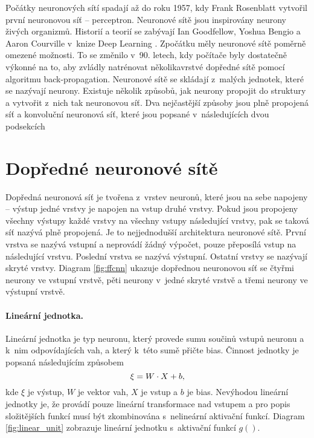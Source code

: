 Počátky neuronových sítí spadají až do roku 1957, kdy Frank Rosenblatt \cite{Rosenblatt1958} vytvořil první neuronovou síť -- perceptron.
Neuronové sítě jsou inspirovány neurony živých organizmů.
Historií a teorií se zabývají Ian Goodfellow, Yoshua Bengio a Aaron Courville v~knize Deep Learning \cite{Goodfellow-et-al-2016}.
Zpočátku měly neuronové sítě poměrně omezené možnosti.
To se změnilo v~90. letech, kdy počítače byly dostatečně výkonné na to, aby zvládly natrénovat několikavrstvé dopředné sítě pomocí algoritmu back-propagation.
Neuronové sítě se skládají z~malých jednotek, které se nazývají neurony.
Existuje několik způsobů, jak neurony propojit do struktury a vytvořit z~nich tak neuronovou síť.
Dva nejčastější způsoby jsou plně propojená síť a konvoluční neuronová síť, které jsou popsané v~následujících dvou podsekcích

\section{Dopředné neuronové sítě}
\label{sub:ffnn}

Dopředná neuronová síť je tvořena z~vrstev neuronů, které jsou na sebe napojeny -- výstup jedné vrstvy je napojen na vstup druhé vrstvy.
Pokud jsou propojeny všechny výstupy každé vrstvy na všechny vstupy následující vrstvy, pak se taková síť nazývá plně propojená.
Je to nejjednodušší architektura neuronové sítě.
První vrstva se nazývá vstupní a neprovádí žádný výpočet, pouze přeposílá vstup na následující vrstvu.
Poslední vrstva se nazývá výstupní.
Ostatní vrstvy se nazývají skryté vrstvy.
Diagram \ref{fig:ffcnn} ukazuje dopřednou neuronovou síť se čtyřmi neurony ve vstupní vrstvě, pěti neurony v~jedné skryté vrstvě a třemi neurony ve výstupní vrstvě.

\paragraph{Lineární jednotka.}
Lineární jednotka je typ neuronu, který provede sumu součinů vstupů neuronu a k~nim odpovídajících vah, a který k~této sumě přičte bias.
Činnost jednotky je popsaná následujícím způsobem \begin{equation}\sisetup{tight-spacing=true} \xi=W\cdot X+b,\label{eq:linear}\end{equation} kde $\xi$ je výstup, $W$ je vektor vah, $X$ je vstup a $b$ je bias.
Nevýhodou lineární jednotky je, že provádí pouze lineární transformace nad vstupem a pro popis složitějších funkcí musí být zkombinována s~nelineární aktivační funkcí.
Diagram \ref{fig:linear_unit} zobrazuje lineární jednotku s~aktivační funkcí $g()$.

